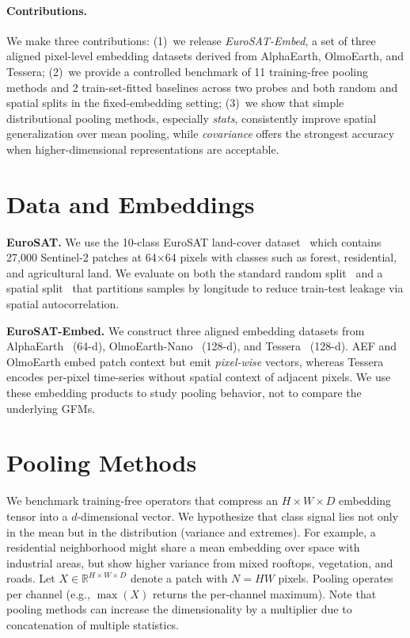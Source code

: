 \documentclass{article} %
\begin{document}
\paragraph{Contributions.}
We make three contributions:
(1)~we release \emph{EuroSAT-Embed}, a set of three aligned pixel-level embedding datasets derived from AlphaEarth, OlmoEarth, and Tessera;
(2)~we provide a controlled benchmark of 11 training-free pooling methods and 2 train-set-fitted baselines across two probes and both random and spatial splits in the fixed-embedding setting;
(3)~we show that simple distributional pooling methods, especially \textit{stats}, consistently improve spatial generalization over mean pooling, while \textit{covariance} offers the strongest accuracy when higher-dimensional representations are acceptable.

\section{Data and Embeddings}

\textbf{EuroSAT.}
We use the 10-class EuroSAT land-cover dataset~\citep{helber2019eurosat} which contains 27,000 Sentinel-2 patches at 64$\times$64 pixels with classes such as forest, residential, and agricultural land.
We evaluate on both the standard random split~\citep{neumann2019domain} and a spatial split~\citep{ekim2025distribution} that partitions samples by longitude to reduce train-test leakage via spatial autocorrelation.

\textbf{EuroSAT-Embed.}
We construct three aligned embedding datasets from AlphaEarth~\citep{brown2025alphaearth} (64-d), OlmoEarth-Nano~\citep{herzog2025olmoearth} (128-d), and Tessera~\citep{feng2025tesseratemporalembeddingssurface} (128-d).
AEF and OlmoEarth embed patch context but emit \emph{pixel-wise} vectors, whereas Tessera encodes per-pixel time-series without spatial context of adjacent pixels.
We use these embedding products to study pooling behavior, not to compare the underlying GFMs.

\section{Pooling Methods}

We benchmark training-free operators that compress an $H{\times}W{\times}D$ embedding tensor into a $d$-dimensional vector.
We hypothesize that class signal lies not only in the mean but in the distribution (variance and extremes).
For example, a residential neighborhood might share a mean embedding over space with industrial areas, but show higher variance from mixed rooftops, vegetation, and roads.
Let $X \in \mathbb{R}^{H \times W \times D}$ denote a patch with $N{=}HW$ pixels.
Pooling operates per channel (e.g., $\max(X)$ returns the per-channel maximum). Note that pooling methods can increase the dimensionality by a multiplier due to concatenation of multiple statistics.
\end{document}
